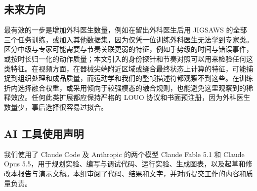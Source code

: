 \subsection{未来方向}

最有效的一步是增加外科医生数量，例如在留出外科医生后用 JIGSAWS 的全部三个任务训练，或加入其他数据集，因为仅凭一位训练外科医生无法学到专家类。区分中级与专家可能需要与节奏关联更弱的特征，例如手势级的时间与错误事件，或按时长归一化的动作质量；本文引入的身份探针和节奏对照可以用来检验任何这类特征。在视频方面，在器械尖端附近区域或缝合最终状态上计算的特征，可能捕捉到组织处理和成品质量，而运动学和我们的整帧描述符都观察不到这些。在训练折内选择融合权重，或采用倾向于较强模态的融合规则，也能避免这里观察到的稀释效应。任何此类扩展都应保持严格的 LOUO 协议和书面预注册，因为外科医生数量少，事后选择很容易过拟合。

\subsection*{AI 工具使用声明}

我们使用了 Claude Code 及 Anthropic 的两个模型 Claude Fable 5.1 和 Claude Opus 5.5，用于规划实验、编写与调试代码、运行实验、生成图表，以及起草和修改本报告与演示文稿。本组审阅了代码、结果和文字，并对所提交工作的内容和质量负责。
